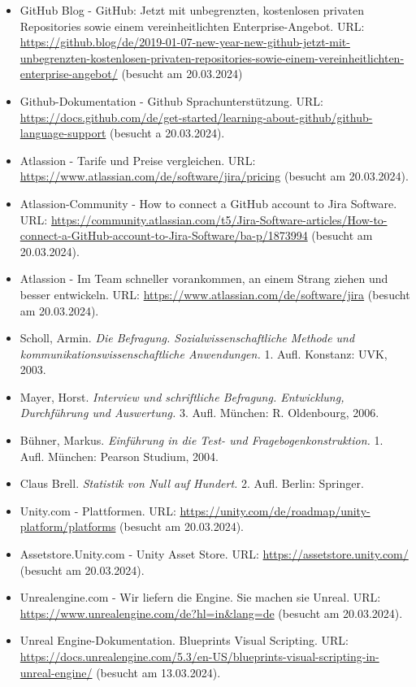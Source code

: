 \begin{itemize}[leftmargin=0pt]
    \item GitHub Blog - GitHub: Jetzt mit unbegrenzten, kostenlosen privaten Repositories sowie einem vereinheitlichten Enterprise-Angebot. {\scriptsize URL:} \url{https://github.blog/de/2019-01-07-new-year-new-github-jetzt-mit-unbegrenzten-kostenlosen-privaten-repositories-sowie-einem-vereinheitlichten-enterprise-angebot/} (besucht am 20.03.2024)
    \item Github-Dokumentation - Github Sprachunterstützung. {\scriptsize URL:} \url{https://docs.github.com/de/get-started/learning-about-github/github-language-support} (besucht a 20.03.2024).
    \item Atlassion - Tarife und Preise vergleichen. {\scriptsize URL:} \url{https://www.atlassian.com/de/software/jira/pricing} (besucht am 20.03.2024).
    \item Atlassion-Community - How to connect a GitHub account to Jira Software. {\scriptsize URL:} \url{https://community.atlassian.com/t5/Jira-Software-articles/How-to-connect-a-GitHub-account-to-Jira-Software/ba-p/1873994} (besucht am 20.03.2024).
    \item Atlassion - Im Team schneller vorankommen, an einem Strang ziehen und besser entwickeln. {\scriptsize URL:} \url{https://www.atlassian.com/de/software/jira} (besucht am 20.03.2024).
    \item Scholl, Armin. \textit{Die Befragung. Sozialwissenschaftliche Methode und kommunikationswissenschaftliche Anwendungen.} 1. Aufl. Konstanz: UVK, 2003.
    \item Mayer, Horst. \textit{Interview und schriftliche Befragung. Entwicklung, Durchführung und Auswertung.} 3. Aufl. München: R. Oldenbourg, 2006.
    \item Bühner, Markus. \textit{Einführung in die Test- und Fragebogenkonstruktion.} 1. Aufl. München: Pearson Studium, 2004.
    \item Claus Brell. \textit{Statistik von Null auf Hundert.} 2. Aufl. Berlin: Springer.
    \item Unity.com - Plattformen. {\scriptsize URL:} \url{https://unity.com/de/roadmap/unity-platform/platforms} (besucht am 20.03.2024).
    \item Assetstore.Unity.com - Unity Asset Store. {\scriptsize URL:} \url{https://assetstore.unity.com/} (besucht am 20.03.2024).
    \item Unrealengine.com - Wir liefern die Engine. Sie machen sie Unreal. {\scriptsize URL:} \url{https://www.unrealengine.com/de?hl=in&lang=de} (besucht am 20.03.2024).
    \item Unreal Engine-Dokumentation. Blueprints Visual Scripting. {\scriptsize URL:} \url{https://docs.unrealengine.com/5.3/en-US/blueprints-visual-scripting-in-unreal-engine/} (besucht am 13.03.2024).

\end{itemize}
